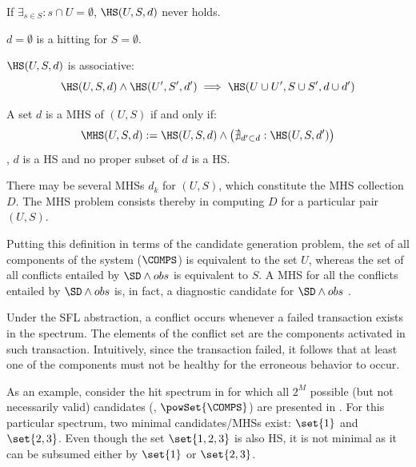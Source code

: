 \begin{corollary}
  \label{cor:intro:unsatisfiablity}
  If $\exists_{s \in S} : s \cap U = \emptyset$, $\HS(U,S,d)$ never holds.
\end{corollary}

\begin{corollary}
  \label{cor:intro:emptyHS}
  $d = \emptyset$ is a hitting for $S = \emptyset$.
\end{corollary}

\begin{corollary}
  \label{cor:intro:associativity}
  $\HS(U,S,d)$ is associative:
  \begin{equation}
    \displaystyle \HS(U,S,d) \wedge \HS(U^\prime,S^\prime,d^\prime) \implies
    \HS(U\cup U^\prime,S \cup S^\prime, d \cup d^\prime)
  \end{equation}
\end{corollary}

\begin{definition}
  A set $d$ is a \acf{MHS} of $(U,S)$ if and only if:
  \begin{equation}
    \label{eq:intro:minimal-hitting-set}
    \MHS(U,S,d):= \HS(U,S,d) \wedge \big(\nexists_{d^\prime \subset d}: \HS(U,S,d^\prime)\big)
  \end{equation}
  \noindent
  \ie, $d$ is a \ac{HS} and no proper subset of $d$ is a \ac{HS}.
\end{definition}
%
There may be several \acp{MHS} $d_k$ for $(U,S)$, which
constitute the \ac{MHS} collection $D$.
%
The \ac{MHS} problem consists thereby in computing $D$ for a
particular pair $(U,S)$.

Putting this definition in terms of the candidate generation problem,
the set of all components of the system ($\COMPS$) is equivalent to
the set $U$, whereas the set of all conflicts entailed by
$\SD \wedge obs$ is equivalent to $S$.
%
A \ac{MHS} for all the conflicts entailed by $\SD \wedge obs$ is, in
fact, a diagnostic candidate for $\SD \wedge obs$ \citep{Reiter87}.


Under the \ac{SFL} abstraction, a conflict occurs whenever a failed
transaction exists in the spectrum.
%
The elements of the conflict set are the components activated in such
transaction.
%
Intuitively, since the transaction failed, it follows that at least
one of the components must not be healthy for the erroneous behavior
to occur.


As an example, consider the hit spectrum in
 for which all $2^M$ possible (but
not necessarily valid) candidates (\ie, $\powSet{\COMPS}$) are
presented in .
%
For this particular spectrum, two minimal candidates/\acp{MHS} exist:
$\set{1}$ and $\set{2,3}$.
%
Even though the set $\set{1,2,3}$ is also \ac{HS}, it is not minimal
as it can be subsumed either by $\set{1}$ or $\set{2,3}$.

